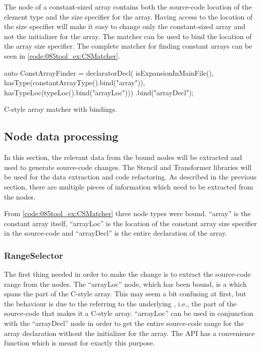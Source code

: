 The  node of a constant-sized array contains both the source-code location of the element type and the size specifier for the array. 
Having access to the location of the size specifier will make it easy to change only the constant-sized array and not the initializer for the array. 
The  matcher can be used to bind the location of the array size specifier.
The complete matcher for finding constant arrays can be seen in \cref{code:085tool_ex:CSMatcher}.

\begin{listing}[H]
    \begin{cppcode}
auto ConstArrayFinder = 
    declaratorDecl(
        isExpansionInMainFile(),
        hasType(constantArrayType().bind("array")),
        hasTypeLoc(typeLoc().bind("arrayLoc")))
    .bind("arrayDecl");
    \end{cppcode}
    \caption{C-style array matcher with bindings.}
    \label{code:085tool_ex:CSMatcher}
\end{listing}

\subsection{Node data processing}

In this section, the relevant data from the bound nodes will be extracted and used to generate source-code changes. The Stencil and Transformer libraries will be used for the data extraction and code refactoring.
As described in the previous section, there are multiple pieces of information which need to be extracted from the nodes. 

From \cref{code:085tool_ex:CSMatcher} three node types were bound. ``array'' is the constant array itself, ``arrayLoc'' is the location of the constant array size specifier in the source-code and ``arrayDecl'' is the entire declaration of the array.

\subsubsection*{RangeSelector}
The first thing needed in order to make the change is to extract the source-code range from the nodes. The ``arrayLoc'' node, which has been bound, is a  which spans the  part of the C-style array.
This may seem a bit confusing at first, but the behaviour is due to the  referring to the underlying , i.e., the part of the source-code that makes it a C-style array.
``arrayLoc'' can be used in conjunction with the ``arrayDecl'' node in order to get the entire source-code range for the array declaration without the initializer for the array. The  API has a convenience function  which is meant for exactly this purpose.

